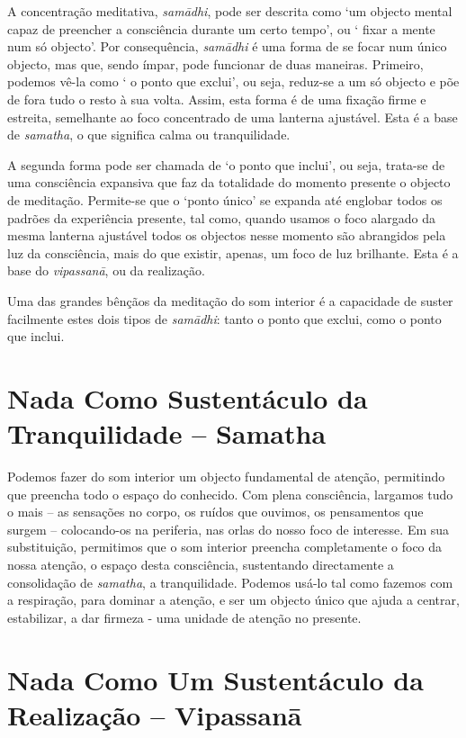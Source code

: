 A concentração meditativa, \emph{samādhi}, pode ser descrita como `um
objecto mental capaz de preencher a consciência durante um certo tempo',
ou ` fixar a mente num só objecto'. Por consequência, \emph{samādhi} é
uma forma de se focar num único objecto, mas que, sendo ímpar, pode
funcionar de duas maneiras. Primeiro, podemos vê-la como ` o ponto que
exclui', ou seja, reduz-se a um só objecto e põe de fora tudo o resto à
sua volta. Assim, esta forma é de uma fixação firme e estreita,
semelhante ao foco concentrado de uma lanterna ajustável. Esta é a base
de \emph{samatha}, o que significa calma ou tranquilidade.

A segunda forma pode ser chamada de `o ponto que inclui', ou seja,
trata-se de uma consciência expansiva que faz da totalidade do momento
presente o objecto de meditação. Permite-se que o `ponto único' se
expanda até englobar todos os padrões da experiência presente, tal como,
quando usamos o foco alargado da mesma lanterna ajustável todos os
objectos nesse momento são abrangidos pela luz da consciência, mais do
que existir, apenas, um foco de luz brilhante. Esta é a base do
\emph{vipassanā}, ou da realização.

Uma das grandes bênçãos da meditação do som interior é a capacidade de
suster facilmente estes dois tipos de \emph{samādhi}: tanto o ponto que
exclui, como o ponto que inclui.

\section{Nada Como Sustentáculo da Tranquilidade -- Samatha}

Podemos fazer do som interior um objecto fundamental de atenção,
permitindo que preencha todo o espaço do conhecido. Com plena
consciência, largamos tudo o mais -- as sensações no corpo, os ruídos
que ouvimos, os pensamentos que surgem -- colocando-os na periferia, nas
orlas do nosso foco de interesse. Em sua substituição, permitimos que o
som interior preencha completamente o foco da nossa atenção, o espaço
desta consciência, sustentando directamente a consolidação de
\emph{samatha}, a tranquilidade. Podemos usá-lo tal como fazemos com a
respiração, para dominar a atenção, e ser um objecto único que ajuda a
centrar, estabilizar, a dar firmeza - uma unidade de atenção no
presente.

\section{Nada Como Um Sustentáculo da Realização -- Vipassanā}

